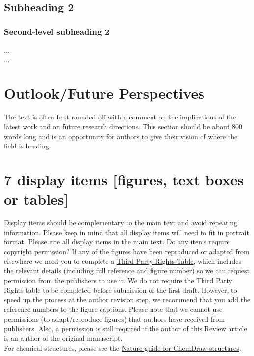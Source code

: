 \documentclass[fleqn,10pt]{wlscirep}
\begin{document}
\subsection*{Subheading 2}
\subsubsection*{Second-level subheading 2}
...\\
...

\section*{Outlook/Future Perspectives}
The text is often best rounded off with a comment on the implications of the latest work and on future research directions.  This section should be about 800 words long and is an opportunity for authors to give their vision of where the field is heading.

\section*{7 display items [figures, text boxes or tables]}

Display items should be complementary to the main text and avoid repeating information. Please keep in mind that all display items will need to fit in portrait format. Please cite all display items in the main text. Do any items require copyright permission? If any of the figures have been reproduced or adapted from elsewhere we need you to complete a \href{http://www.nature.com/licenceforms/npg/thirdpartyrights-table.doc}{Third Party Rights Table}, which includes the relevant details (including full reference and figure number) so we can request permission from the publishers to use it.  We do not require the Third Party Rights table to be completed before submission of the first draft.  However, to speed up the process at the author revision step, we recommend that you add the reference numbers to the figure captions.  Please note that we cannot use permissions (to adapt/reproduce figures) that authors have received from publishers. Also, a permission is still required if the author of this Review article is an author of the original manuscript.\\

\noindent For chemical structures, please see the \href {https://www.nature.com/documents/nr-chemical-structures-guide.pdf}{Nature guide for ChemDraw structures}.\\
\end{document}
